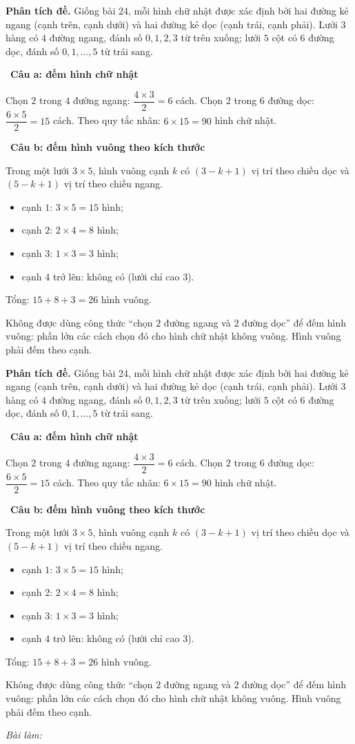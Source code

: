 \documentclass[11pt]{article}
\newif\ifsol \soltrue
\newcommand{\probsol}[1]{%
  \begin{lrbox}{\solmeasure}\begin{minipage}{\dimexpr\linewidth-24pt\relax}#1\end{minipage}\end{lrbox}%
  \ifsol
    \begin{solbox}#1\end{solbox}%
  \else
    \setlength{\solht}{\dimexpr\ht\solmeasure+\dp\solmeasure+0.85cm\relax}%
    \ifdim\solht<1.35cm\setlength{\solht}{1.35cm}\fi
    \ifdim\solht>\StudentMaxWork\setlength{\solht}{\StudentMaxWork}\fi
    \begin{tcolorbox}[colback=white,colframe=Line,boxrule=0.8pt,arc=5pt,
      left=8pt,right=8pt,top=4pt,bottom=4pt,height=\solht]{\footnotesize\color{Slate}\itshape\WorkWord}\end{tcolorbox}%
  \fi}
\newlength{\StudentMaxWork}\setlength{\StudentMaxWork}{7.5cm}
\newcommand{\step}[2]{\par\smallskip\noindent{\bfseries\color{tmBlue!85!black}\StepWord~#1.}\ {\bfseries #2}\par\nopagebreak}
\def\WorkWord{Bài làm:}
\def\StepWord{Bước}
\begin{document}
\probsol{
\textbf{Phân tích đề.} Giống bài 24, mỗi hình chữ nhật được xác định bởi hai đường kẻ ngang (cạnh trên, cạnh dưới) và hai đường kẻ dọc
(cạnh trái, cạnh phải). Lưới $3$ hàng có $4$ đường ngang, đánh số $0,1,2,3$ từ trên xuống; lưới $5$ cột có $6$ đường dọc, đánh số
$0,1,\dots,5$ từ trái sang.

\step{1}{Câu a: đếm hình chữ nhật}
Chọn $2$ trong $4$ đường ngang: $\dfrac{4\times3}{2}=6$ cách. Chọn $2$ trong $6$ đường dọc: $\dfrac{6\times5}{2}=15$ cách.
Theo quy tắc nhân: $6\times15=90$ hình chữ nhật.

\step{2}{Câu b: đếm hình vuông theo kích thước}
\begin{recallbox}Trong một lưới $3\times5$, hình vuông cạnh $k$ có $(3-k+1)$ vị trí theo chiều dọc và $(5-k+1)$ vị trí theo chiều ngang.\end{recallbox}
\begin{itemize}[leftmargin=1.2em,itemsep=1pt,topsep=2pt]
\item cạnh $1$: $3\times5=15$ hình;
\item cạnh $2$: $2\times4=8$ hình;
\item cạnh $3$: $1\times3=3$ hình;
\item cạnh $4$ trở lên: không có (lưới chỉ cao $3$).
\end{itemize}
Tổng: $15+8+3=26$ hình vuông.
\begin{warnbox}Không được dùng công thức ``chọn $2$ đường ngang và $2$ đường dọc'' để đếm hình vuông: phần lớn các cách chọn đó cho hình chữ
nhật không vuông. Hình vuông phải đếm theo cạnh.\end{warnbox}

}
\end{document}
